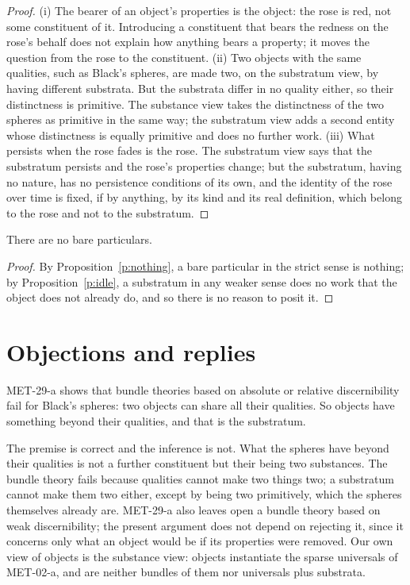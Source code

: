 \documentclass{situationist-preprint}
\begin{document}
\begin{proof}
(i) The bearer of an object's properties is the object: the rose is red, not some constituent of it. Introducing a constituent that bears the redness on the rose's behalf does not explain how anything bears a property; it moves the question from the rose to the constituent. (ii) Two objects with the same qualities, such as Black's spheres, are made two, on the substratum view, by having different substrata. But the substrata differ in no quality either, so their distinctness is primitive. The substance view takes the distinctness of the two spheres as primitive in the same way; the substratum view adds a second entity whose distinctness is equally primitive and does no further work. (iii) What persists when the rose fades is the rose. The substratum view says that the substratum persists and the rose's properties change; but the substratum, having no nature, has no persistence conditions of its own, and the identity of the rose over time is fixed, if by anything, by its kind and its real definition, which belong to the rose and not to the substratum.
\end{proof}

\begin{theorem}\label{t:main}
There are no bare particulars.
\end{theorem}

\begin{proof}
By Proposition~\ref{p:nothing}, a bare particular in the strict sense is nothing; by Proposition~\ref{p:idle}, a substratum in any weaker sense does no work that the object does not already do, and so there is no reason to posit it.
\end{proof}

\section{Objections and replies}

\begin{objection}
MET-29-a shows that bundle theories based on absolute or relative discernibility fail for Black's spheres: two objects can share all their qualities. So objects have something beyond their qualities, and that is the substratum.
\end{objection}

\begin{reply}
The premise is correct and the inference is not. What the spheres have beyond their qualities is not a further constituent but their being two substances. The bundle theory fails because qualities cannot make two things two; a substratum cannot make them two either, except by being two primitively, which the spheres themselves already are. MET-29-a also leaves open a bundle theory based on weak discernibility; the present argument does not depend on rejecting it, since it concerns only what an object would be if its properties were removed. Our own view of objects is the substance view: objects instantiate the sparse universals of MET-02-a, and are neither bundles of them nor universals plus substrata.
\end{reply}
\end{document}
